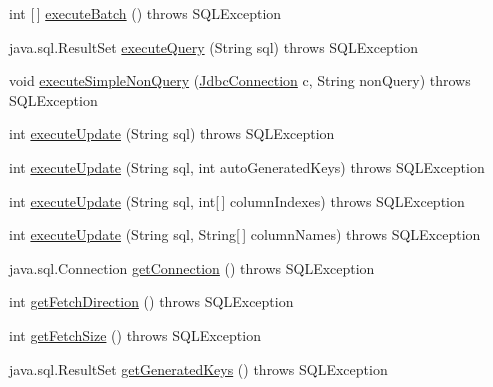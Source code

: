\begin{DoxyCompactItemize}
int \mbox{[}$\,$\mbox{]} \mbox{\hyperlink{classcom_1_1mysql_1_1cj_1_1jdbc_1_1_statement_impl_a812ff94727864cc68fe96aaa38dbce6a}{execute\+Batch}} ()  throws S\+Q\+L\+Exception 
\item 
java.\+sql.\+Result\+Set \mbox{\hyperlink{classcom_1_1mysql_1_1cj_1_1jdbc_1_1_statement_impl_ad8bdf41d3e788681fe1adcf961b176ef}{execute\+Query}} (String sql)  throws S\+Q\+L\+Exception 
\item 
void \mbox{\hyperlink{classcom_1_1mysql_1_1cj_1_1jdbc_1_1_statement_impl_a27a4381bb8f1b302a3f8e06cf3276023}{execute\+Simple\+Non\+Query}} (\mbox{\hyperlink{interfacecom_1_1mysql_1_1cj_1_1jdbc_1_1_jdbc_connection}{Jdbc\+Connection}} c, String non\+Query)  throws S\+Q\+L\+Exception 
\item 
int \mbox{\hyperlink{classcom_1_1mysql_1_1cj_1_1jdbc_1_1_statement_impl_a8df7dbcd016833437419cfdbae14b187}{execute\+Update}} (String sql)  throws S\+Q\+L\+Exception 
\item 
int \mbox{\hyperlink{classcom_1_1mysql_1_1cj_1_1jdbc_1_1_statement_impl_a17446c85d153a1456965eb64858b5f46}{execute\+Update}} (String sql, int auto\+Generated\+Keys)  throws S\+Q\+L\+Exception 
\item 
int \mbox{\hyperlink{classcom_1_1mysql_1_1cj_1_1jdbc_1_1_statement_impl_a2ff60b126d55ceb7d991c9d5f56cebb6}{execute\+Update}} (String sql, int\mbox{[}$\,$\mbox{]} column\+Indexes)  throws S\+Q\+L\+Exception 
\item 
int \mbox{\hyperlink{classcom_1_1mysql_1_1cj_1_1jdbc_1_1_statement_impl_ad715518d5ddeca0a3a8771646c467d0b}{execute\+Update}} (String sql, String\mbox{[}$\,$\mbox{]} column\+Names)  throws S\+Q\+L\+Exception 
\item 
java.\+sql.\+Connection \mbox{\hyperlink{classcom_1_1mysql_1_1cj_1_1jdbc_1_1_statement_impl_a5e4c41ddb78ca7533f4984c9f6c996c4}{get\+Connection}} ()  throws S\+Q\+L\+Exception 
\item 
int \mbox{\hyperlink{classcom_1_1mysql_1_1cj_1_1jdbc_1_1_statement_impl_ab0ef6daffffd7fd9dc6405c78b697b7d}{get\+Fetch\+Direction}} ()  throws S\+Q\+L\+Exception 
\item 
int \mbox{\hyperlink{classcom_1_1mysql_1_1cj_1_1jdbc_1_1_statement_impl_a2e309596729b0de9bc9230e745c9350f}{get\+Fetch\+Size}} ()  throws S\+Q\+L\+Exception 
\item 
java.\+sql.\+Result\+Set \mbox{\hyperlink{classcom_1_1mysql_1_1cj_1_1jdbc_1_1_statement_impl_a498dcb08802ab5ebfb700b3bae3ff1f2}{get\+Generated\+Keys}} ()  throws S\+Q\+L\+Exception 
\item 

\end{DoxyCompactItemize}

